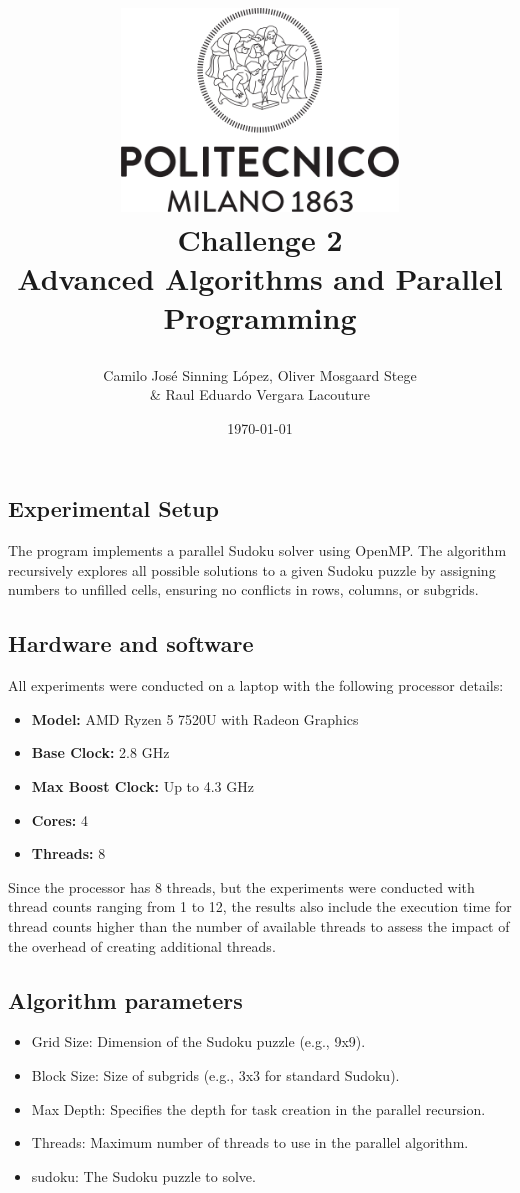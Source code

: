 \documentclass[a4paper,10pt]{article}
\title{
    \vspace{2cm} %
    \includegraphics[width=0.55\textwidth]{Logo_Polimi.png} \\ %
    \vspace{1cm} %
    \textbf{\Huge Challenge 2} \\
    \vspace{1cm} %
    \large Advanced Algorithms and Parallel Programming \\
    \vspace{0.5cm} %
    \large \date{\today}
}
\author{Camilo José Sinning López, Oliver Mosgaard Stege\\ \& Raul Eduardo Vergara Lacouture}
\begin{document}
\maketitle
\thispagestyle{empty}
\newpage

\setcounter{page}{1}  %

\begin{multicols}{2} 
\section{Experimental Setup}

The program implements a parallel Sudoku solver using OpenMP. The algorithm recursively explores all possible solutions to a given Sudoku puzzle by assigning numbers to unfilled cells, ensuring no conflicts in rows, columns, or subgrids.

\subsection{Hardware and software}

All experiments were conducted on a laptop with the following processor details:

\begin{itemize}
    \item \textbf{Model:} AMD Ryzen 5 7520U with Radeon Graphics
    \item \textbf{Base Clock:} 2.8 GHz
    \item \textbf{Max Boost Clock:} Up to 4.3 GHz
    \item \textbf{Cores:} 4
    \item \textbf{Threads:} 8
\end{itemize}

Since the processor has 8 threads, but the experiments were conducted with thread counts ranging from 1 to 12, the results also include the execution time for thread counts higher than the number of available threads to assess the impact of the overhead of creating additional threads.

\subsection{Algorithm parameters}

\begin{itemize}
    \item Grid Size: Dimension of the Sudoku puzzle (e.g., 9x9).
    \item Block Size: Size of subgrids (e.g., 3x3 for standard Sudoku).
    \item Max Depth: Specifies the depth for task creation in the parallel recursion.
    \item Threads: Maximum number of threads to use in the parallel algorithm.
    \item sudoku: The Sudoku puzzle to solve.
\end{itemize}


\end{multicols}
\end{document}
